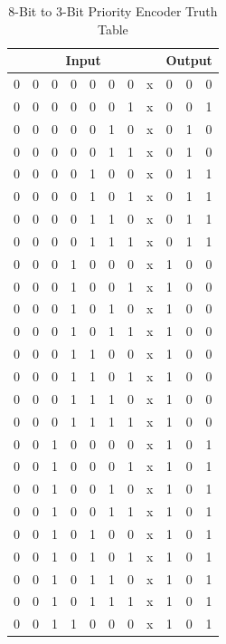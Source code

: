 \documentclass[conference]{IEEEtran}
\begin{document}
\begin{table}[htbp]
\caption{8-Bit to 3-Bit Priority Encoder Truth Table}
\begin{center}
\begin{tabular}{|c|c|c|c|c|c|c|c|c|c|c|}
\hline
\multicolumn{8}{|c|}{\textbf{Input}} & \multicolumn{3}{|c|}{\textbf{Output}} \\
\hline
0 & 0 & 0 & 0 & 0 & 0 & 0 & x & 0 & 0 & 0 \\
\hline
0 & 0 & 0 & 0 & 0 & 0 & 1 & x & 0 & 0 & 1 \\
\hline
0 & 0 & 0 & 0 & 0 & 1 & 0 & x & 0 & 1 & 0 \\
\hline
0 & 0 & 0 & 0 & 0 & 1 & 1 & x & 0 & 1 & 0 \\
\hline
0 & 0 & 0 & 0 & 1 & 0 & 0 & x & 0 & 1 & 1 \\
\hline
0 & 0 & 0 & 0 & 1 & 0 & 1 & x & 0 & 1 & 1 \\
\hline
0 & 0 & 0 & 0 & 1 & 1 & 0 & x & 0 & 1 & 1 \\
\hline
0 & 0 & 0 & 0 & 1 & 1 & 1 & x & 0 & 1 & 1 \\
\hline
0 & 0 & 0 & 1 & 0 & 0 & 0 & x & 1 & 0 & 0 \\
\hline
0 & 0 & 0 & 1 & 0 & 0 & 1 & x & 1 & 0 & 0 \\
\hline
0 & 0 & 0 & 1 & 0 & 1 & 0 & x & 1 & 0 & 0 \\
\hline
0 & 0 & 0 & 1 & 0 & 1 & 1 & x & 1 & 0 & 0 \\
\hline
0 & 0 & 0 & 1 & 1 & 0 & 0 & x & 1 & 0 & 0 \\
\hline
0 & 0 & 0 & 1 & 1 & 0 & 1 & x & 1 & 0 & 0 \\
\hline
0 & 0 & 0 & 1 & 1 & 1 & 0 & x & 1 & 0 & 0 \\
\hline
0 & 0 & 0 & 1 & 1 & 1 & 1 & x & 1 & 0 & 0 \\
\hline
0 & 0 & 1 & 0 & 0 & 0 & 0 & x & 1 & 0 & 1 \\
\hline
0 & 0 & 1 & 0 & 0 & 0 & 1 & x & 1 & 0 & 1 \\
\hline
0 & 0 & 1 & 0 & 0 & 1 & 0 & x & 1 & 0 & 1 \\
\hline
0 & 0 & 1 & 0 & 0 & 1 & 1 & x & 1 & 0 & 1 \\
\hline
0 & 0 & 1 & 0 & 1 & 0 & 0 & x & 1 & 0 & 1 \\
\hline
0 & 0 & 1 & 0 & 1 & 0 & 1 & x & 1 & 0 & 1 \\
\hline
0 & 0 & 1 & 0 & 1 & 1 & 0 & x & 1 & 0 & 1 \\
\hline
0 & 0 & 1 & 0 & 1 & 1 & 1 & x & 1 & 0 & 1 \\
\hline
0 & 0 & 1 & 1 & 0 & 0 & 0 & x & 1 & 0 & 1 \\

\end{tabular}
\end{center}
\end{table}
\end{document}
